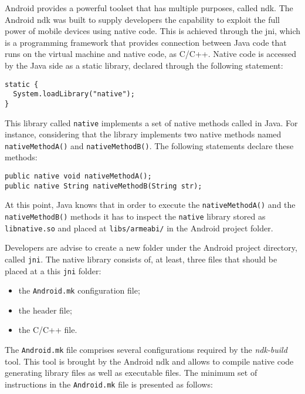 Android provides a powerful toolset that has multiple purposes, called \gls{ndk}.  The Android \gls{ndk} was built to supply developers the capability to exploit the full power of mobile devices using native code. This is achieved through the \gls{jni}, which is a programming framework that provides connection between Java code that runs on the virtual machine and native code, as C/C++. Native code is accessed by the Java side as a static library, declared through the following statement:

\begin{lstlisting}[caption=Declare a JNI library in Java]
static { 
  System.loadLibrary("native");
}
\end{lstlisting}

This library called \texttt{native} implements a set of native methods called in Java. For instance, considering that the library implements two native methods named \texttt{nativeMethodA()} and \texttt{nativeMethodB()}. The following statements declare these methods:

\begin{lstlisting}[style=JavaInputStyle]
public native void nativeMethodA();
public native String nativeMethodB(String str);
\end{lstlisting}

At this point, Java knows that in order to execute the \texttt{nativeMethodA()} and the \texttt{nativeMethodB()} methods it has to inspect the \texttt{native} library stored as \texttt{libnative.so} and placed at \texttt{libs/armeabi/} in the Android project folder.

Developers are advise to create a new folder under the Android project directory, called \texttt{jni}. The native library consists of, at least, three files that should be placed at a this \texttt{jni} folder:

\begin{itemize}
\item the \texttt{Android.mk} configuration file;
\item the header file;
\item the C/C++ file.
\end{itemize}

The \texttt{Android.mk} file comprises several configurations required by the \textit{ndk-build} tool. This tool is brought by the Android \gls{ndk} and allows to compile native code generating library files as well as executable files. The minimum set of instructions in the \texttt{Android.mk} file is presented as follows:

